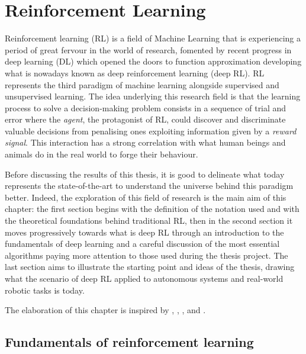 \chapter{Reinforcement Learning} \label{ch2}

Reinforcement learning (RL) is a field of Machine Learning that is experiencing a period of great fervour in the world of research, fomented by recent progress in deep learning (DL) which opened the doors to function approximation developing what is nowadays known as deep reinforcement learning (deep RL).
RL represents the third paradigm of machine learning alongside supervised and unsupervised learning. The idea underlying this research field is that the learning process to solve a decision-making problem consists in a sequence of trial and error where the \textit{agent}, the protagonist of RL, could discover and discriminate valuable decisions from penalising ones exploiting information given by a \textit{reward signal}. This interaction has a strong correlation with what human beings and animals do in the real world to forge their behaviour.

Before discussing the results of this thesis, it is good to delineate what today represents the state-of-the-art to understand the universe behind this paradigm better. Indeed, the exploration of this field of research is the main aim of this chapter: the first section begins with the definition of the notation used and with the theoretical foundations behind traditional RL, then in the second section it moves progressively towards what is deep RL through an introduction to the fundamentals of deep learning and a careful discussion of the most essential algorithms paying more attention to those used during the thesis project.
The last section aims to illustrate the starting point and ideas of the thesis, drawing what the scenario of deep RL applied to autonomous systems and real-world robotic tasks is today.


The elaboration of this chapter is inspired by \cite{silver2015lectures}, \cite{sutton2018reinforcement}, \cite{openai2018spinningup}, \cite{lapan2018deep} and \cite{franccois2018introduction}.

\section{Fundamentals of reinforcement learning} \label{fundreinflearn}


